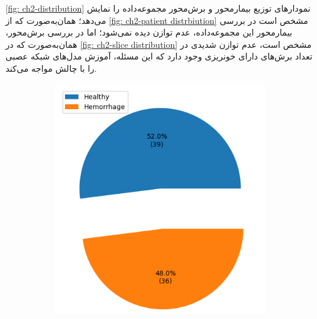 \autoref{fig: ch2-distribution}
نمودارهای توزیع بیمارمحور و برش‌محور مجموعه‌داده را نمایش می‌دهد؛ همان‌به‌صورت که از ‎\autoref{fig: ch2-patient distrbiution}‎ مشخص است در بررسی بیمار‌محور این مجموعه‌داده، عدم توازن دیده نمی‌شود؛ اما در بررسی برش‌محور، همان‌به‌صورت که در ‎\autoref{fig: ch2-slice distribution}‎ 
مشخص است، عدم توازن شدیدی در تعداد برش‌های دارای خونریزی وجود دارد که این مسئله، آموزش مدل‌های شبکه عصبی را با چالش مواجه می‌کند.
 \begin{figure}[ht]
		\centering %
		\begin{subfigure}{0.45\textwidth}
			\includegraphics[width=\linewidth]{Images/Chapter2/patient distrbiution.png}
			\caption{}
			\label{fig: ch2-patient distrbiution}
		\end{subfigure}\hfil %
		\begin{subfigure}{0.45\textwidth}

\end{subfigure}
\end{figure}
